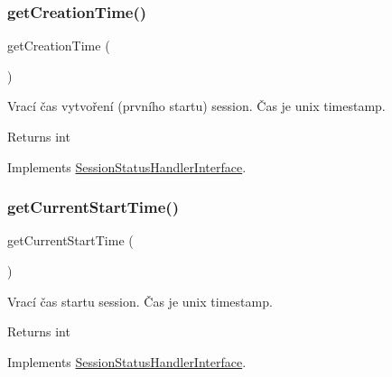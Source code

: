 \subsubsection{\texorpdfstring{get\+Creation\+Time()}{getCreationTime()}}
{\footnotesize\ttfamily get\+Creation\+Time (\begin{DoxyParamCaption}{ }\end{DoxyParamCaption})}

Vrací čas vytvoření (prvního startu) session. Čas je unix timestamp.

\begin{DoxyReturn}{Returns}
int 
\end{DoxyReturn}


Implements \mbox{\hyperlink{interface_pes_1_1_session_1_1_session_status_handler_interface}{Session\+Status\+Handler\+Interface}}.

\mbox{\label{class_pes_1_1_session_1_1_session_status_handler_a2ac1590473377275979c720110f5cfed}} 
\subsubsection{\texorpdfstring{get\+Current\+Start\+Time()}{getCurrentStartTime()}}
{\footnotesize\ttfamily get\+Current\+Start\+Time (\begin{DoxyParamCaption}{ }\end{DoxyParamCaption})}

Vrací čas startu session. Čas je unix timestamp.

\begin{DoxyReturn}{Returns}
int 
\end{DoxyReturn}


Implements \mbox{\hyperlink{interface_pes_1_1_session_1_1_session_status_handler_interface}{Session\+Status\+Handler\+Interface}}.

\mbox{\label{class_pes_1_1_session_1_1_session_status_handler_a0a413f841ff7f4681218eebe9acc847f}} 
